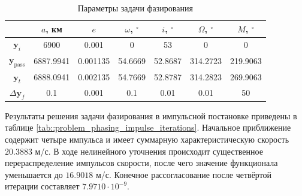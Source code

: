 \begin{table}[!h]
\centering
\caption{Параметры задачи фазирования}
\label{tab::problem_phasing}
\renewcommand{\arraystretch}{1.25}
\begin{tabular}{|c|c|c|c|c|c|c|}
\hline
 & $a$, км & $e$ & $\omega$, $^\circ$ & $i$, $^\circ$ & $\Omega$, $^\circ$ & $M$, $^\circ$ \\
\hline
$\mathbf{y}_i$ 
& 6900 & 0.001 & 0 & 53 & 0 & 0 \\
\hline
$\mathbf{y}_{\text{pass}}$
& 6887.9941 & 0.001135 & 54.6669 & 52.8687 & 314.2723 & 219.9063 \\
\hline
$\mathbf{y}_t$
& 6888.0941 & 0.002135 & 54.7669 & 52.8787 & 314.2823 & 269.9063 \\
\hline
$\Delta \mathbf{y}_f$
& 0.1 & 0.001 & 0.1 & 0.01 & 0.01 & 50 \\
\hline
\end{tabular}
\end{table}

Результаты решения задачи фазирования в импульсной постановке приведены в таблице \ref{tab::problem_phasing_impulse_iterations}. Начальное приближение содержит четыре импульса и имеет суммарную характеристическую скорость $20.3883$ м/с. В ходе нелинейного уточнения происходит существенное перераспределение импульсов скорости, после чего значение функционала уменьшается до $16.9018$ м/с. Конечное рассогласование после четвёртой итерации составляет $7.9710 \cdot 10^{-9}$.

